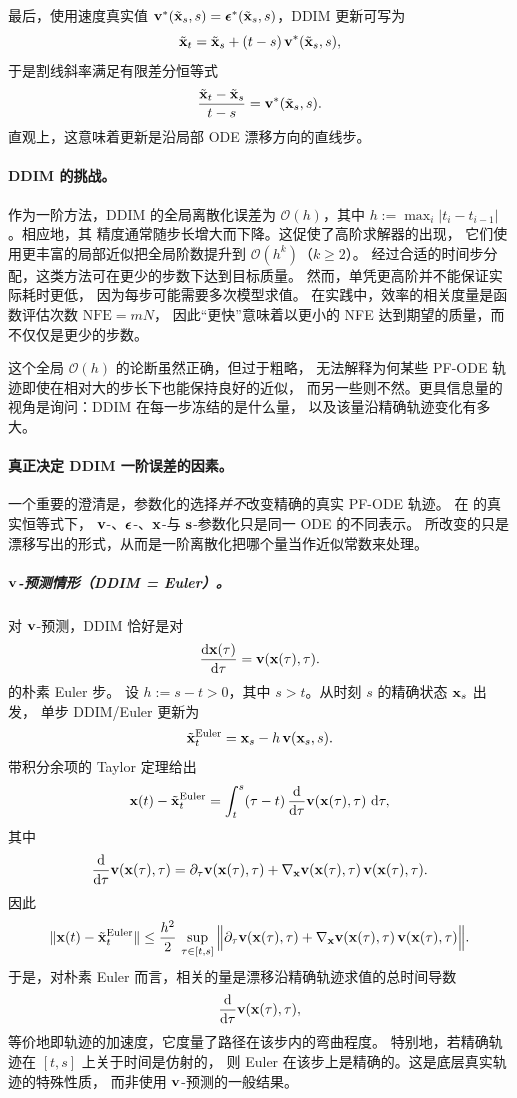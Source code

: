最后，使用速度真实值 ${\mathbf{v}}^*(\tilde{{\mathbf{x}}}_s,s) = {\bm{\epsilon}}^*(\tilde{{\mathbf{x}}}_s,s)$，DDIM 更新可写为
\[
\tilde{{\mathbf{x}}}_t = \tilde{{\mathbf{x}}}_s + (t-s)\,{\mathbf{v}}^*(\tilde{{\mathbf{x}}}_s,s),
\]
于是割线斜率满足有限差分恒等式
\[
\frac{\tilde{{\mathbf{x}}}_t-\tilde{{\mathbf{x}}}_s}{t-s} = {\mathbf{v}}^*(\tilde{{\mathbf{x}}}_s,s).
\]
直观上，这意味着更新是沿局部 ODE 漂移方向的直线步。


\paragraph{DDIM 的挑战。}
作为一阶方法，DDIM 的全局离散化误差为
$\mathcal O(h)$，其中 $h:=\max_i |t_i-t_{i-1}|$。相应地，其
精度通常随步长增大而下降。这促使了高阶求解器的出现，
它们使用更丰富的局部近似把全局阶数提升到 $\mathcal O(h^k)$（$k\ge 2$）。
经过合适的时间步分配，这类方法可在更少的步数下达到目标质量。
然而，单凭更高阶并不能保证实际耗时更低，
因为每步可能需要多次模型求值。
在实践中，效率的相关度量是函数评估次数 $\mathrm{NFE}=mN$，
因此“更快”意味着以更小的 NFE 达到期望的质量，而不仅仅是更少的步数。

这个全局 $\mathcal O(h)$ 的论断虽然正确，但过于粗略，
无法解释为何某些 PF-ODE 轨迹即使在相对大的步长下也能保持良好的近似，
而另一些则不然。更具信息量的视角是询问：DDIM 在每一步冻结的是什么量，
以及该量沿精确轨迹变化有多大。

\paragraph{真正决定 DDIM 一阶误差的因素。}
一个重要的澄清是，参数化的选择\emph{并不}改变精确的真实 PF-ODE 轨迹。
在  的真实恒等式下，
${\mathbf{v}}$-、${\bm{\epsilon}}$-、${\mathbf{x}}$-与 ${\mathbf{s}}$-参数化只是同一 ODE 的不同表示。
所改变的只是漂移写出的形式，从而是一阶离散化把哪个量当作近似常数来处理。

\subparagraph{${\mathbf{v}}$-预测情形（DDIM = Euler）。}
对 ${\mathbf{v}}$-预测，DDIM 恰好是对
\[
\frac{\mathop{}\!\mathrm{d} {\mathbf{x}}(\tau)}{\mathop{}\!\mathrm{d} \tau}={\mathbf{v}}({\mathbf{x}}(\tau),\tau).
\]
的朴素 Euler 步。
设 $h:=s-t>0$，其中 $s>t$。从时刻 $s$ 的精确状态 ${\mathbf{x}}_s$ 出发，
单步 DDIM/Euler 更新为
\[
\tilde{{\mathbf{x}}}_t^{\mathrm{Euler}}
=
{\mathbf{x}}_s-h\,{\mathbf{v}}({\mathbf{x}}_s,s).
\]
带积分余项的 Taylor 定理给出
\[
{\mathbf{x}}(t)-\tilde{{\mathbf{x}}}_t^{\mathrm{Euler}}
=
\int_t^s (\tau-t)\,
\frac{\mathop{}\!\mathrm{d}}{\mathop{}\!\mathrm{d} \tau}{\mathbf{v}}({\mathbf{x}}(\tau),\tau)\,\mathop{}\!\mathrm{d}\tau,
\]
其中
\[
\frac{\mathop{}\!\mathrm{d}}{\mathop{}\!\mathrm{d} \tau}{\mathbf{v}}({\mathbf{x}}(\tau),\tau)
=
\partial_\tau {\mathbf{v}}({\mathbf{x}}(\tau),\tau)
+
\nabla_{{\mathbf{x}}}{\mathbf{v}}({\mathbf{x}}(\tau),\tau)\,{\mathbf{v}}({\mathbf{x}}(\tau),\tau).
\]
因此
\[
\|{\mathbf{x}}(t)-\tilde{{\mathbf{x}}}_t^{\mathrm{Euler}}\|
\le
\frac{h^2}{2}\,
\sup_{\tau\in[t,s]}
\Big\|
\partial_\tau {\mathbf{v}}({\mathbf{x}}(\tau),\tau)
+
\nabla_{{\mathbf{x}}}{\mathbf{v}}({\mathbf{x}}(\tau),\tau)\,{\mathbf{v}}({\mathbf{x}}(\tau),\tau)
\Big\|.
\]
于是，对朴素 Euler 而言，相关的量是漂移沿精确轨迹求值的总时间导数
\[
\frac{\mathop{}\!\mathrm{d}}{\mathop{}\!\mathrm{d} \tau}{\mathbf{v}}({\mathbf{x}}(\tau),\tau),
\]
等价地即轨迹的加速度，它度量了路径在该步内的弯曲程度。
特别地，若精确轨迹在 $[t,s]$ 上关于时间是仿射的，
则 Euler 在该步上是精确的。这是底层真实轨迹的特殊性质，
而非使用 ${\mathbf{v}}$-预测的一般结果。

